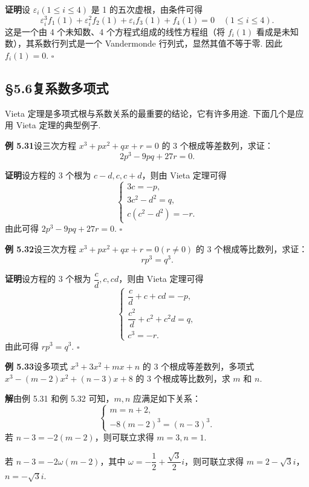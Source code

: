 \documentclass[UTF8, 12pt, fontset=fandol, oneside]{ctexart}
\begin{document}
\noindent\textbf{证明}\quad 设 $\varepsilon_i(1\le i\le4)$ 是 1 的五次虚根，由条件可得
\[
\varepsilon_i^3f_1(1)+\varepsilon_i^2f_2(1)+\varepsilon_i f_3(1)+f_4(1)=0\quad (1\le i\le4).
\]
这是一个由 4 个未知数、4 个方程式组成的线性方程组（将 $f_i(1)$ 看成是未知数），其系数行列式是一个 Vandermonde 行列式，显然其值不等于零. 因此 $f_i(1)=0$. \hfill $\square$

\subsection*{§5.6\quad 复系数多项式}

Vieta 定理是多项式根与系数关系的最重要的结论，它有许多用途. 下面几个是应用 Vieta 定理的典型例子.

\noindent\textbf{例 5.31}\quad 设三次方程 $x^3+px^2+qx+r=0$ 的 3 个根成等差数列，求证：
\[
2p^3-9pq+27r=0.
\]

\noindent\textbf{证明}\quad 设方程的 3 个根为 $c-d,c,c+d$，则由 Vieta 定理可得
\[
\left\{
\begin{array}{l}
3c=-p,\\
3c^2-d^2=q,\\
c(c^2-d^2)=-r.
\end{array}
\right.
\]
由此可得 $2p^3-9pq+27r=0$. \hfill $\square$

\noindent\textbf{例 5.32}\quad 设三次方程 $x^3+px^2+qx+r=0(r\ne0)$ 的 3 个根成等比数列，求证：
\[
rp^3=q^3.
\]

\noindent\textbf{证明}\quad 设方程的 3 个根为 $\dfrac{c}{d},c,cd$，则由 Vieta 定理可得
\[
\left\{
\begin{array}{l}
\dfrac{c}{d}+c+cd=-p,\\
\dfrac{c^2}{d}+c^2+c^2d=q,\\
c^3=-r.
\end{array}
\right.
\]
由此可得 $rp^3=q^3$. \hfill $\square$

\noindent\textbf{例 5.33}\quad 设多项式 $x^3+3x^2+mx+n$ 的 3 个根成等差数列，多项式 $x^3-(m-2)x^2+(n-3)x+8$ 的 3 个根成等比数列，求 $m$ 和 $n$.

\noindent\textbf{解}\quad 由例 5.31 和例 5.32 可知，$m,n$ 应满足如下关系：
\[
\left\{
\begin{array}{l}
m=n+2,\\
-8(m-2)^3=(n-3)^3.
\end{array}
\right.
\]
若 $n-3=-2(m-2)$，则可联立求得 $m=3,n=1$.

若 $n-3=-2\omega(m-2)$，其中 $\omega=-\dfrac12+\dfrac{\sqrt3}{2}i$，则可联立求得 $m=2-\sqrt3 i$，$n=-\sqrt3 i$.
\end{document}
